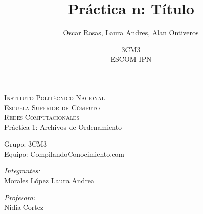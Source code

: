 \documentclass[12pt, fleqn]{report}                             %
\author{Oscar Rosas, Laura Andres, Alan Ontiveros}              %
\title{Práctica n: Título}
\author{3CM3\\
	ESCOM-IPN}
\theoremstyle{break}                                            %
\begin{document}
    \lstset{inputencoding=utf8/latin1}
	\begin{titlepage}
		\begin{center}
			
			
			\noindent
			
			\textsc{\LARGE Instituto Politécnico Nacional}\\[0.5cm]
			
			\textsc{\Large Escuela Superior de Cómputo}\\[1cm]
			
			\textsc{\Large Redes Computacionales}\\[1cm]
			
			
			{ \huge Práctica 1: Archivos de Ordenamiento\\[1cm] }
			
			{ \Large Grupo: 3CM3} \\[1cm]


			
            { \Large Equipo: CompilandoConocimiento.com} \\[1cm]
			
			\noindent
			\begin{minipage}{0.5\textwidth}
				\begin{flushleft} \large
					\emph{Integrantes:}\\
					Morales López Laura Andrea\\
				\end{flushleft}
			\end{minipage}%
			\begin{minipage}{0.5\textwidth}
				\begin{flushright} \large
					\emph{Profesora:} \\
					Nidia Cortez
				\end{flushright}
			\end{minipage}
			
			
			\vfill
		\end{center}
	\end{titlepage}
	\maketitle
	
\end{document}

